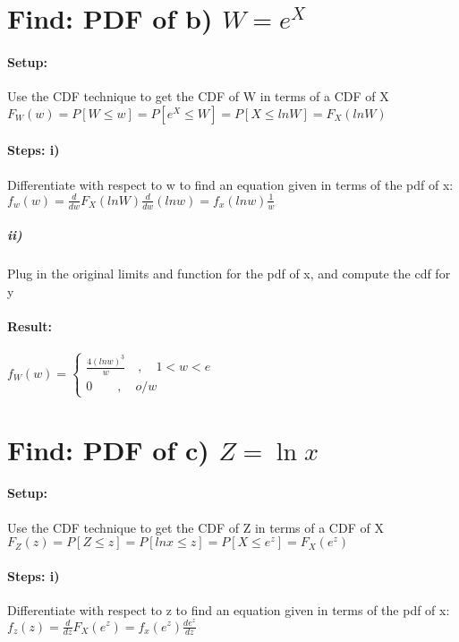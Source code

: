  \section*{Find: PDF of b) $W={ e }^{ X }$} 
 
 \paragraph{Setup:} Use the CDF technique to get the CDF of W in terms of a CDF of X\\${ F }_{ W }(w)=P[W\le w]=P[{ e }^{ X }\le W]=P[X\le{lnW} ]={ F }_{ X }(lnW)$

\paragraph{Steps: i)} Differentiate with respect to w to find an equation given in terms of the pdf of x:\\ ${ f }_{ w }(w)=\frac { d }{ dw } { F }_{ X }(lnW)\frac{d }{ dw }(lnw)={ f }_{ x }(lnw)\frac { 1 }{ w } $

\subparagraph{ii)} Plug in the original limits and function for the pdf of x, and compute the cdf for y

\paragraph{Result:} ${ f }_{ W }(w)=\begin{cases} \frac{{ 4(lnw) }^{3}}{w} \quad ,\quad 1<w<e \\ 0\quad  \quad ,\quad o/w \end{cases}$
 
 \section*{Find: PDF of c) $Z=\ln x$ }
 
 \paragraph{Setup:} Use the CDF technique to get the CDF of Z in terms of a CDF of X\\${ F }_{ Z }(z)=P[Z\le z]=P[lnx\le z]=P[X \le{e}^{z} ]={ F }_{ X }({e}^{z})$

\paragraph{Steps: i)} Differentiate with respect to z to find an equation given in terms of the pdf of x:\\ ${ f }_{ z }(z)=\frac { d }{ dz } { F }_{ X }({e}^{z})={ f }_{ x }({e}^{z})\frac { d{e}^{z} }{ dz } $

